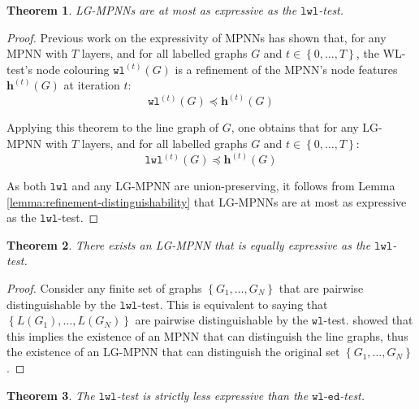 \documentclass{article}
\newtheorem{theorem}{Theorem}
\newcommand{\set}[1]{\left\{#1\right\}}
\newcommand{\iter}[1]{^{(#1)}}
\newcommand{\wl}{\texttt{wl}}
\newcommand{\wledge}{\texttt{wl-ed}}
\newcommand{\lwl}{\texttt{lwl}}
\newcommand{\bs}[1]{\boldsymbol{#1}}
\newcommand{\feat}{\bs{h}}
\begin{document}
\begin{theorem} \label{thm:lg-mpnn-less-than-lwl}
    LG-MPNNs are at most as expressive as the $\lwl$-test. 
\end{theorem}
\begin{proof}
    Previous work on the expressivity of MPNNs \cite{morris2019weisfeiler} has shown that, for any MPNN with $T$ layers, and for all labelled graphs $G$ and $t\in\set{0,\dots,T}$, the WL-test's node colouring $\wl\iter{t}(G)$ is a refinement of the MPNN's node features $\feat\iter{t}(G)$ at iteration $t$:
    \begin{equation}
        \wl\iter{t}(G) \preceq \feat\iter{t}(G)
    \end{equation}

    Applying this theorem to the line graph of $G$, one obtains that for any LG-MPNN with $T$ layers, and for all labelled graphs $G$ and $t\in\set{0,\dots,T}$:
    \begin{equation}    \label{eq:lwl-refinement-of-lg-mpnn}
        \lwl\iter{t}(G) \preceq \feat\iter{t}(G)
    \end{equation}

    As both $\lwl$ and any LG-MPNN are union-preserving, it follows from Lemma \ref{lemma:refinement-distinguishability} that LG-MPNNs are at most as expressive as the $\lwl$-test.
\end{proof}

\begin{theorem} \label{thm:lg-mpnn-equal-to-lwl}
    There exists an LG-MPNN that is equally expressive as the $\lwl$-test.
\end{theorem}
\begin{proof}
    Consider any finite set of graphs $\set{G_1, \dots, G_N}$ that are pairwise distinguishable by the $\lwl$-test. This is equivalent to saying that $\set{L(G_1), \dots, L(G_N)}$ are pairwise distinguishable by the $\wl$-test. \cite{xu2018powerful} showed that this implies the existence of an MPNN that can distinguish the line graphs, thus the existence of an LG-MPNN that can distinguish the original set $\set{G_1, \dots, G_N}$.
\end{proof}

\begin{theorem} \label{thm:lwl-less-than-wledge}
    The $\lwl$-test is strictly less expressive than the $\wledge$-test.
\end{theorem}
\newlength{\WLOGarrowwidth}
\newcommand{\RightarrowAsWideAsWLOGArrow}{\makebox[\WLOGarrowwidth][c]{$\Rightarrow$}}
\end{document}
